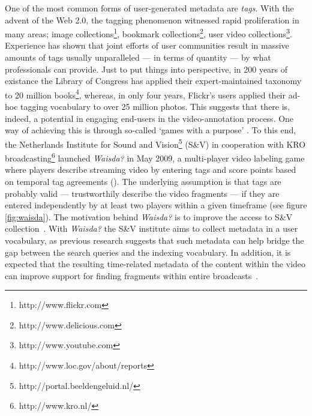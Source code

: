One of the most common forms of user-generated metadata are \textit{tags}. With the advent of the Web 2.0, the tagging phenomenon witnessed rapid proliferation in many
areas; image collections\footnote{http://www.flickr.com}, bookmark collections\footnote{http://www.delicious.com}, user video collections\footnote{http://www.youtube.com}. Experience has shown that joint efforts of user communities result in massive amounts of tags usually unparalleled --- in terms of quantity --- by what professionals can provide. Just to put things into perspective, in 200 years of existance the Library of Congress has applied their expert-maintained taxonomy to 20 million books\footnote{http://www.loc.gov/about/reports}, whereas, in only four years, Flickr's users applied their ad-hoc tagging vocabulary to over 25 million photos. This suggests that there is, indeed, a potential in engaging end-users in the video-annotation process. One way of achieving this is through so-called `games with a purpose' \cite{gwap}. To this end, the Netherlands Institute for Sound and Vision\footnote{http://portal.beeldengeluid.nl/} (S\&V) in cooperation with KRO broadcasting\footnote{http://www.kro.nl/} launched \textit{Waisda?} in May 2009, a multi-player video labeling game where players describe streaming video by entering tags and score points based on temporal tag agreements (). The underlying assumption is that tags are probably valid --- trustworthily describe the video fragments --- if they are entered independently by at least two players within a given timeframe (see figure \ref{fig:waisda}). The motivation behind \textit{Waisda?} is to improve the access to S\&V collection~\cite{johanwebsci}. With \textit{Waisda?} the S\&V institute aims to collect metadata in a user vocabulary, as previous research \cite{Jorgensen2007} suggests that such metadata can help bridge the gap between the search queries and the indexing vocabulary. In addition, it is expected that the resulting time-related metadata of the content within the video can improve support for finding fragments within entire broadcasts~\cite{bouke}. 

